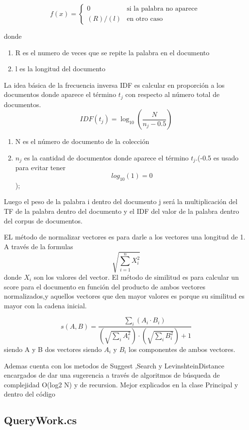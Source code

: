 \documentclass[a4paper,12pt]{article}
\begin{document}
\[
    f(x)=
    \begin{cases}
        0 &\text{si la palabra no aparece } \\
        (R)/(l) &\text{en otro caso }
    \end{cases}
\]

donde 
\begin{enumerate}
    \item R es el numero de veces que se repite la palabra en el documento
    \item l es la longitud del documento
\end{enumerate}

La idea básica de la frecuencia inversa IDF es calcular en proporción a los
documentos donde aparece el t\'ermino $t_j$  con respecto al n\'umero total de
documentos.
\[ IDF(t_j)= 
\log_{10}\left(\frac{N}{n_j-0.5}\right)\]

\begin{enumerate}
    \item N es el n\'umero de documento  de la colección
    \item $n_j$ es la cantidad de documentos donde aparece el t\'ermino $t_j$.(-0.5 es usado
    para evitar tener \[log_{10}(1)=0\]);
\end{enumerate}

Luego el peso de la palabra i dentro del documento j será la multiplicación del
TF  de la palabra dentro del documento y el IDF del valor de la palabra dentro del
corpus de documentos.

EL método de normalizar vectores es para darle a los vectores una longitud de
1. A través de la formulas \[
    \sqrt{\sum_{i=1}^{n} X_i^2}
    \]
donde $X_i$ son los valores del vector.
El método de similitud es para calcular un score para el documento en  función
del producto de ambos vectores normalizados,y aquellos vectores que den
mayor valores es porque su similitud es mayor con la cadena inicial.

\[
s(A,B) = \frac{\sum_{i} (A_i \cdot B_i)}{(\sqrt{\sum_{i} A_i^2}) \cdot (\sqrt{\sum_{i} B_i^2}) + 1}
\]
siendo A y B dos vectores siendo $A_i$ y $B_i$ los componentes de ambos vectores.


Ademas cuenta con los metodos de Suggest ,Search y LevinshteinDistance encargados de dar una sugerencia a trav\'es de 
algoritmos de b\'usqueda de complejidad O(log2 N) y de recursion. Mejor explicados en la clase Principal y dentro del 
c\'odigo
\subsection{QueryWork.cs}
\end{document}
